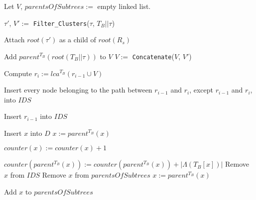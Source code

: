 \documentclass{article}
\begin{document}
    \begin{algorithm}
        \begin{algorithmic}[1]
                \State Let $V$, $parentsOfSubtrees :=$ empty linked list.

                    \State $\tau'$, $V' := $ \texttt{Filter\_Clusters}($\tau$, $T_B||\tau$)

                    \State Attach $root(\tau')$ as a child of $root(R_s)$

                        \State Add $parent^{T_B}(root(T_B||\tau))$ to $V$
                    \Else
                        \State $V :=$ \texttt{Concatenate}($V$, $V'$)
                    \EndIf
                \EndFor

                \State Compute $r_i := lca^{T_B}(r_{i-1} \cup V)$

                \State Insert every node belonging to the path between $r_{i-1}$ and $r_i$, except $r_{i-1}$ and $r_i$, into $IDS$

                    \State Insert $r_{i-1}$ into $IDS$
                \EndIf

                        \State Insert $x$ into $D$
                        \State $x := parent^{T_B}(x)$
                    \EndWhile
                \EndFor

                    \State $counter(x) := counter(x) + 1$

                        \State $counter(parent^{T_B}(x)) := counter(parent^{T_B}(x)) + |\Lambda(T_B[x])|$
                        \State Remove $x$ from $IDS$
                            \State Remove $x$ from $parentsOfSubtrees$
                        \EndIf
                        \State $x := parent^{T_B}(x)$
                    \EndWhile

                        \State Add $x$ to $parentsOfSubtrees$
                    \EndIf
                \EndFor


\end{algorithmic}
\end{algorithm}
\end{document}
